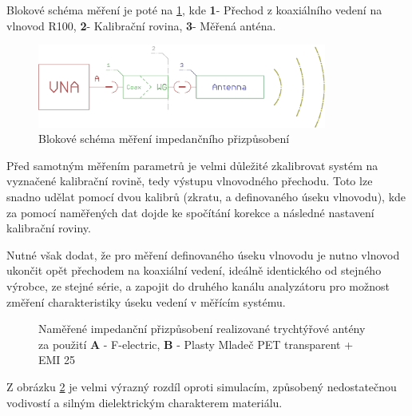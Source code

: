 Blokové schéma měření je poté na \ref{fig:MatchDia}, kde \textbf{1}- Přechod z koaxiálního vedení na vlnovod R100, \textbf{2}- Kalibrační rovina, \textbf{3}- Měřená anténa.
\begin{figure}[!htbp]
\begin{center}
\includegraphics[width=9.5cm]{pics/MatchDia}
\caption{Blokové schéma měření impedančního přizpůsobení}
\label{fig:MatchDia}
\end{center}
\end{figure}

Před samotným měřením parametrů je velmi důležité zkalibrovat systém na vyznačené kalibrační rovině, tedy výstupu vlnovodného přechodu. Toto lze snadno udělat pomocí dvou kalibrů (zkratu, a definovaného úseku vlnovodu), kde za pomocí naměřených dat dojde ke spočítání korekce a následné nastavení kalibrační roviny.

Nutné však dodat, že pro měření definovaného úseku vlnovodu je nutno vlnovod ukončit opět přechodem na koaxiální vedení, ideálně identického od stejného výrobce, ze stejné série, a zapojit do druhého kanálu analyzátoru pro možnost změření charakteristiky úseku vedení v měřícím systému. 

\begin{figure}[!htbp]
\caption{Naměřené impedanční přizpůsobení realizované trychtýřové antény za použití \textbf{A} - F-electric, \textbf{B} - Plasty Mladeč PET transparent + EMI 25}
\label{fig:Matching}
\end{figure}

Z obrázku \ref{fig:Matching} je velmi výrazný rozdíl oproti simulacím, způsobený nedostatečnou vodivostí a silným dielektrickým charakterem materiálu.

